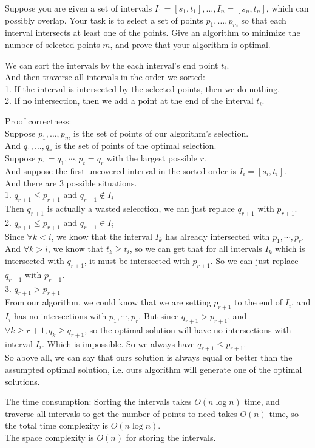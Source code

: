 \problem{}
Suppose you are given a set of intervals $I_1 = [s_1, t_1], \ldots, I_n = [s_n, t_n]$, which can possibly overlap.  Your task is to select a set of points $p_1, \ldots, p_m$ so that each interval intersects at least one of the points.  Give an algorithm to minimize the number of selected points $m$, and prove that your algorithm is optimal.

\solution{}
We can sort the intervals by the each interval's end point $t_i$.\\
And then traverse all intervals in the order we sorted:\\
1. If the interval is intersected by the selected points, then we do nothing.\\
2. If no intersection, then we add a point at the end of the interval $t_i$.

Proof correctness:\\
Suppose $p_1, \ldots, p_m$ is the set of points of our algorithm's selection.\\
And $q_1, \ldots, q_r$ is the set of points of the optimal selection.\\
Suppose $p_1=q_1, \cdots, p_t=q_r$ with the largest possible $r$.\\
And suppose the first uncovered interval in the sorted order is $I_i=[s_i, t_i]$.\\
And there are $3$ possible situations.\\
1. $q_{r+1} \leq p_{r+1}$ and $q_{r+1}\not\in I_i$\\
Then $q_{r+1}$ is actually a wasted selecction, we can just replace $q_{r+1}$ with $p_{r+1}$.\\
2. $q_{r+1} \leq p_{r+1}$ and $q_{r+1}\in I_i$\\
Since $\forall k<i$, we know that the interval $I_k$ has already intersected with $p_1,\cdots,p_r$.\\
And $\forall k>i$, we know that $t_k\geq t_i$, so we can get that for all intervals $I_k$ which is intersected with $q_{r+1}$, it must be intersected with $p_{r+1}$.
So we can just replace $q_{r+1}$ with $p_{r+1}$.\\
3. $q_{r+1} > p_{r+1}$\\
From our algorithm, we could know that we are setting $p_{r+1}$ to the end of $I_i$, and $I_i$ has no intersections with $p_{1},\cdots,p_r$.
But since $q_{r+1}>p_{r+1}$, and $\forall k\geq r+1, q_k\geq q_{r+1}$, so the optimal solution will have no intersections with interval $I_i$.
Which is impossible. So we always have $q_{r+1}\leq p_{r+1}$.\\

So above all, we can say that ours solution is always equal or better than the assumpted optimal solution, i.e. ours algorithm will generate one of the optimal solutions.

The time consumption: Sorting the intervals takes $O(n\log n)$ time, and traverse all intervals to get the number of points to need takes $O(n)$ time,
so the total time complexity is $O(n\log n)$.\\
The space complexity is $O(n)$ for storing the intervals.\\

\newpage